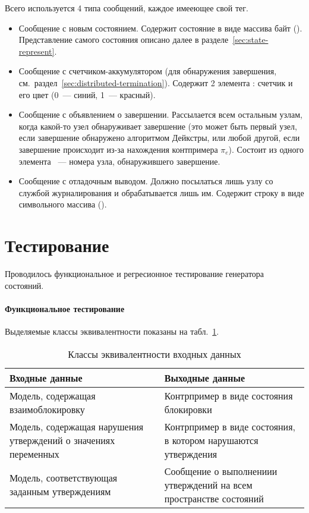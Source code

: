 Всего используется 4 типа сообщений, каждое имееющее свой тег.
\begin{itemize}
\item Сообщение с новым состоянием. Содержит состояние в виде массива байт
  (). Представление самого состояния описано далее в
  разделе~\ref{sec:state-represent}.
\item Сообщение с счетчиком-аккумулятором (для обнаружения завершения,
  см.~раздел~\ref{sec:distributed-termination}). Содержит 2 элемента :
  счетчик и его цвет (0~--- синий, 1~--- красный).
\item Сообщение с объявлением о завершении. Рассылается всем остальным узлам, когда
  какой-то узел обнаруживает завершение (это может быть первый узел, если завершение
  обнаружено алгоритмом Дейкстры, или любой другой, если завершение происходит из-за
  нахождения контпримера $\pi_e$). Состоит из одного элемента ~--- номера
  узла, обнаружившего завершение.
\item Сообщение с отладочным выводом. Должно посылаться лишь узлу со службой
  журналирования и обрабатывается лишь им. Содержит строку в виде символьного массива
  ().
\end{itemize}

\section{Тестирование}
\label{sec:stategen-testing}

Проводилось функциональное и регресионное тестирование генератора состояний.

\paragraph{Функциональное тестирование}

Выделяемые классы эквивалентности показаны на табл.~\ref{tab:stategen-systests-equiv}.

\begin{table}[ht]
  \centering
  \caption{Классы эквивалентности входных данных}
  \begin{tabular}{|p{}|p{}|}
    \hline
    Входные данные & Выходные данные \\
    \hline
    Модель, содержащая взаимоблокировку & Контрпример в виде состояния блокировки \\ \hline
    Модель, содержащая нарушения утверждений о значениях переменных & Контрпример в виде
    состояния, в котором нарушаются утверждения \\ \hline
    Модель, соответствующая заданным утверждениям & Сообщение о выполнениии утверждений на
    всем пространстве состояний \\
    \hline
  \end{tabular}
  \label{tab:stategen-systests-equiv}
\end{table}

